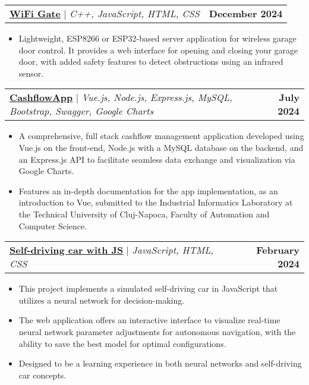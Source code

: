 \documentclass[letterpaper,11pt]{article}
\makeatletter
\newcommand{\resumeItem}[1]{
  \item\small{
    {#1 \vspace{-2pt}}
  }
}
\newcommand{\resumeProjectHeading}[2]{
    \item
    \begin{tabular*}{1.001\textwidth}{l@{\extracolsep{\fill}}r}
      \small#1 & \textbf{\small #2}\\
    \end{tabular*}\vspace{-7pt}
}
\newcommand{\resumeItemListStart}{\begin{itemize}}
\newcommand{\resumeItemListEnd}{\end{itemize}\vspace{-5pt}}
\makeatother
\begin{document}
 \newpage
    \resumeProjectHeading
    {\textbf{\href{https://github.com/BogdanBargaoanu/WiFi-Gate}{WiFi Gate}} $|$ \emph{C++, JavaScript, HTML, CSS}}{December 2024}
    \resumeItemListStart
        \resumeItem{Lightweight, ESP8266 or ESP32-based server application for wireless garage door control. It provides a web interface for opening and closing your garage door, with added safety features to detect obstructions using an infrared sensor.}
    \resumeItemListEnd
 
    \vspace{-15pt}
    \resumeProjectHeading
    {\textbf{\href{https://github.com/BogdanBargaoanu/CashflowApp}{CashflowApp}} $|$ \emph{Vue.js, Node.js, Express.js, MySQL, Bootstrap, Swagger, Google Charts}}{July 2024}
    \resumeItemListStart
        \resumeItem{A comprehensive, full stack cashflow management application developed using Vue.js on the front-end, Node.js with a MySQL database on the backend, and an Express.js API to facilitate seamless data exchange and visualization via Google Charts.}
        \resumeItem{Features an in-depth documentation for the app implementation, as an introduction to Vue, submitted to the Industrial Informatics Laboratory at the Technical University of Cluj-Napoca, Faculty of Automation and Computer Science.}
    \resumeItemListEnd


\begin{comment}



    \vspace{-5pt}
\resumeProjectHeading
{\textbf{Tic Tac Toe with Minimax Algorithm} $|$ \emph{Python and Tkinter}}{March 2024}
\resumeItemListStart
\resumeItem{Implemented a Tic Tac Toe game with an AI opponent powered by the Minimax algorithm, showcasing expertise in artificial intelligence and algorithmic decision-making.}
\resumeItem{Designed and developed a graphical user interface using the Tkinter library, providing intuitive interaction and visual feedback for enhanced user experience.}
\resumeItemListEnd
 \end{comment}  
    \vspace{-15pt}
        \resumeProjectHeading
          {\textbf{\href{https://github.com/BogdanBargaoanu/JavaScriptSelfDrivingCar}{Self-driving car with JS}} $|$ \emph{JavaScript, HTML, CSS}}{February 2024}
          \resumeItemListStart
            \resumeItem{This project implements a simulated self-driving car in JavaScript that utilizes a neural network for decision-making.}
            \resumeItem{The web application offers an interactive interface to visualize real-time neural network parameter adjustments for autonomous navigation, with the ability to save the best model for optimal configurations.}
            \resumeItem{Designed to be a learning experience in both neural networks and self-driving car concepts.}
    \resumeItemListEnd 
 
\end{document}
